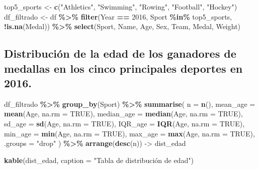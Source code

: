 \documentclass[
]{book}
\newenvironment{Shaded}{\begin{snugshade}}{\end{snugshade}}
\newcommand{\AttributeTok}[1]{\textcolor[rgb]{0.13,0.29,0.53}{#1}}
\newcommand{\ConstantTok}[1]{\textcolor[rgb]{0.56,0.35,0.01}{#1}}
\newcommand{\DecValTok}[1]{\textcolor[rgb]{0.00,0.00,0.81}{#1}}
\newcommand{\FunctionTok}[1]{\textcolor[rgb]{0.13,0.29,0.53}{\textbf{#1}}}
\newcommand{\NormalTok}[1]{#1}
\newcommand{\OtherTok}[1]{\textcolor[rgb]{0.56,0.35,0.01}{#1}}
\newcommand{\SpecialCharTok}[1]{\textcolor[rgb]{0.81,0.36,0.00}{\textbf{#1}}}
\newcommand{\StringTok}[1]{\textcolor[rgb]{0.31,0.60,0.02}{#1}}
\begin{document}
\begin{Shaded}
\begin{Highlighting}[]
\NormalTok{top5\_sports }\OtherTok{\textless{}{-}} \FunctionTok{c}\NormalTok{(}\StringTok{"Athletics"}\NormalTok{, }\StringTok{"Swimming"}\NormalTok{, }\StringTok{"Rowing"}\NormalTok{, }\StringTok{"Football"}\NormalTok{, }\StringTok{"Hockey"}\NormalTok{)}
\NormalTok{df\_filtrado }\OtherTok{\textless{}{-}}\NormalTok{ df }\SpecialCharTok{\%\textgreater{}\%}
  \FunctionTok{filter}\NormalTok{(Year }\SpecialCharTok{==} \DecValTok{2016}\NormalTok{, Sport }\SpecialCharTok{\%in\%}\NormalTok{ top5\_sports, }\SpecialCharTok{!}\FunctionTok{is.na}\NormalTok{(Medal)) }\SpecialCharTok{\%\textgreater{}\%}
  \FunctionTok{select}\NormalTok{(Sport, Name, Age, Sex, Team, Medal, Weight)}
\end{Highlighting}
\end{Shaded}

\subsection*{Distribución de la edad de los ganadores de medallas en los cinco principales deportes en 2016.}\label{distribuciuxf3n-de-la-edad-de-los-ganadores-de-medallas-en-los-cinco-principales-deportes-en-2016.}

\begin{Shaded}
\begin{Highlighting}[]
\NormalTok{df\_filtrado }\SpecialCharTok{\%\textgreater{}\%}
  \FunctionTok{group\_by}\NormalTok{(Sport) }\SpecialCharTok{\%\textgreater{}\%}
    \FunctionTok{summarise}\NormalTok{(}
      \AttributeTok{n =} \FunctionTok{n}\NormalTok{(),}
      \AttributeTok{mean\_age =} \FunctionTok{mean}\NormalTok{(Age, }\AttributeTok{na.rm =} \ConstantTok{TRUE}\NormalTok{),}
      \AttributeTok{median\_age =} \FunctionTok{median}\NormalTok{(Age, }\AttributeTok{na.rm =} \ConstantTok{TRUE}\NormalTok{),}
      \AttributeTok{sd\_age =} \FunctionTok{sd}\NormalTok{(Age, }\AttributeTok{na.rm =} \ConstantTok{TRUE}\NormalTok{),}
      \AttributeTok{IQR\_age =} \FunctionTok{IQR}\NormalTok{(Age, }\AttributeTok{na.rm =} \ConstantTok{TRUE}\NormalTok{),}
      \AttributeTok{min\_age =} \FunctionTok{min}\NormalTok{(Age, }\AttributeTok{na.rm =} \ConstantTok{TRUE}\NormalTok{),}
      \AttributeTok{max\_age =} \FunctionTok{max}\NormalTok{(Age, }\AttributeTok{na.rm =} \ConstantTok{TRUE}\NormalTok{),}
      \AttributeTok{.groups =} \StringTok{"drop"}
\NormalTok{    ) }\SpecialCharTok{\%\textgreater{}\%}
    \FunctionTok{arrange}\NormalTok{(}\FunctionTok{desc}\NormalTok{(n)) }\OtherTok{{-}\textgreater{}}\NormalTok{ dist\_edad}

\FunctionTok{kable}\NormalTok{(dist\_edad, }\AttributeTok{caption =} \StringTok{"Tabla de distribución de edad"}\NormalTok{)}
\end{Highlighting}
\end{Shaded}
\end{document}
